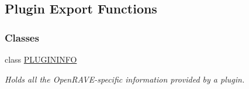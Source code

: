 \hypertarget{group__plugin__exports}{
\subsection{Plugin Export Functions}
\label{group__plugin__exports}
}
\subsubsection*{Classes}
\begin{DoxyCompactItemize}
\item 
class \hyperlink{classOpenRAVE_1_1PLUGININFO}{PLUGININFO}
\begin{DoxyCompactList}\small\item\em Holds all the OpenRAVE-\/specific information provided by a plugin. \item\end{DoxyCompactList}\end{DoxyCompactItemize}
